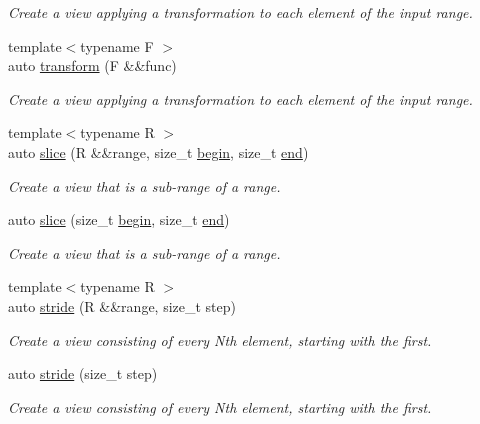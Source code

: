 \begin{DoxyCompactItemize}
\begin{DoxyCompactList}\small\item\em Create a view applying a transformation to each element of the input range. \end{DoxyCompactList}\item 
{\footnotesize template$<$typename F $>$ }\\auto \mbox{\hyperlink{namespacerah_1_1view_a814771afc1cfedc6418915550bcd5bbd}{transform}} (F \&\&func)
\begin{DoxyCompactList}\small\item\em Create a view applying a transformation to each element of the input range. \end{DoxyCompactList}\item 
{\footnotesize template$<$typename R $>$ }\\auto \mbox{\hyperlink{namespacerah_1_1view_a0f7381d90a8dce8c910b023a8b382974}{slice}} (R \&\&range, size\+\_\+t \mbox{\hyperlink{namespacerah_a2c4a19e57cc4e0753e93830f247def6d}{begin}}, size\+\_\+t \mbox{\hyperlink{namespacerah_aaddd1442cd76b96876e692cdefe7261d}{end}})
\begin{DoxyCompactList}\small\item\em Create a view that is a sub-\/range of a range. \end{DoxyCompactList}\item 
auto \mbox{\hyperlink{namespacerah_1_1view_a727bbf69817ca3e940597885764e2032}{slice}} (size\+\_\+t \mbox{\hyperlink{namespacerah_a2c4a19e57cc4e0753e93830f247def6d}{begin}}, size\+\_\+t \mbox{\hyperlink{namespacerah_aaddd1442cd76b96876e692cdefe7261d}{end}})
\begin{DoxyCompactList}\small\item\em Create a view that is a sub-\/range of a range. \end{DoxyCompactList}\item 
{\footnotesize template$<$typename R $>$ }\\auto \mbox{\hyperlink{namespacerah_1_1view_ad71e78df55f6f9416e2869a8c14f6779}{stride}} (R \&\&range, size\+\_\+t step)
\begin{DoxyCompactList}\small\item\em Create a view consisting of every Nth element, starting with the first. \end{DoxyCompactList}\item 
auto \mbox{\hyperlink{namespacerah_1_1view_abed0df62d7146e5d0905725efab0e40e}{stride}} (size\+\_\+t step)
\begin{DoxyCompactList}\small\item\em Create a view consisting of every Nth element, starting with the first. \end{DoxyCompactList}\item 

\end{DoxyCompactItemize}

